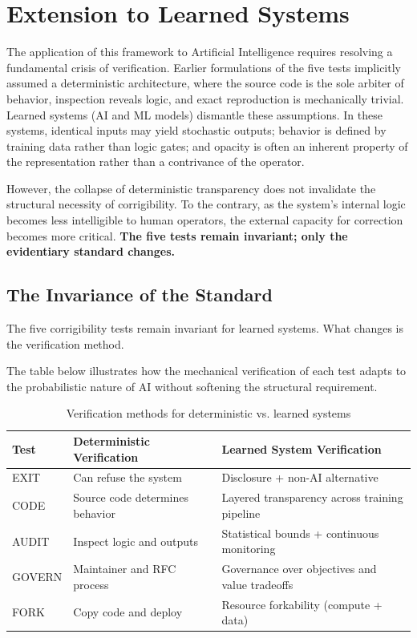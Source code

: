 \section{Extension to Learned Systems}
\label{sec:learned}

The application of this framework to Artificial Intelligence requires resolving a fundamental crisis of verification. Earlier formulations of the five tests implicitly assumed a deterministic architecture, where the source code is the sole arbiter of behavior, inspection reveals logic, and exact reproduction is mechanically trivial. Learned systems (AI and ML models) dismantle these assumptions. In these systems, identical inputs may yield stochastic outputs; behavior is defined by training data rather than logic gates; and opacity is often an inherent property of the representation rather than a contrivance of the operator.

However, the collapse of deterministic transparency does not invalidate the structural necessity of corrigibility. To the contrary, as the system's internal logic becomes less intelligible to human operators, the external capacity for correction becomes more critical. \textbf{The five tests remain invariant; only the evidentiary standard changes.}

\subsection{The Invariance of the Standard}

\begin{proposition}
The five corrigibility tests remain invariant for learned systems. What changes is the verification method.
\end{proposition}

The table below illustrates how the mechanical verification of each test adapts to the probabilistic nature of AI without softening the structural requirement.

\begin{table}[htbp]
\centering
\begin{tabular}{@{}lll@{}}
\toprule
\textbf{Test} & \textbf{Deterministic Verification} & \textbf{Learned System Verification} \\
\midrule
EXIT & Can refuse the system & Disclosure + non-AI alternative \\
CODE & Source code determines behavior & Layered transparency across training pipeline \\
AUDIT & Inspect logic and outputs & Statistical bounds + continuous monitoring \\
GOVERN & Maintainer and RFC process & Governance over objectives and value tradeoffs \\
FORK & Copy code and deploy & Resource forkability (compute + data) \\
\bottomrule
\end{tabular}
\caption{Verification methods for deterministic vs. learned systems}
\end{table}

